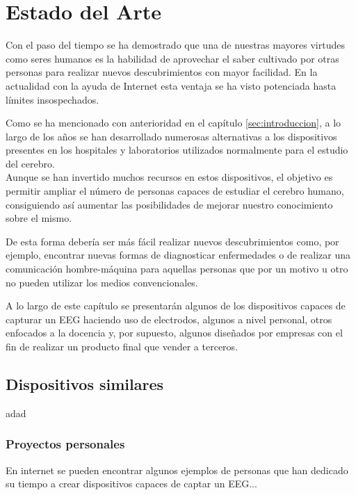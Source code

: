 \chapter{Estado del Arte\label{sec:EstadoDelArte}}

Con el paso del tiempo se ha demostrado que una de nuestras mayores virtudes como seres humanos es la habilidad de aprovechar el saber cultivado por otras personas para realizar nuevos descubrimientos con mayor facilidad. En la actualidad con la ayuda de Internet esta ventaja se ha visto potenciada hasta límites insospechados.

Como se ha mencionado con anterioridad en el capítulo \ref{sec:introduccion}, a lo largo de los años se han desarrollado numerosas alternativas a los dispositivos presentes en los hospitales y laboratorios utilizados normalmente para el estudio del cerebro. 
\\Aunque se han invertido muchos recursos en estos dispositivos, el objetivo es permitir ampliar el número de personas capaces de estudiar el cerebro humano, consiguiendo  así aumentar las posibilidades de mejorar nuestro conocimiento sobre el mismo.

De esta forma debería ser más fácil realizar nuevos descubrimientos como, por ejemplo, encontrar nuevas formas de diagnosticar enfermedades o de realizar una comunicación hombre-máquina para aquellas personas que por un motivo u otro no pueden utilizar los medios convencionales.

A lo largo de este capítulo se presentarán algunos de los dispositivos capaces de capturar un EEG haciendo uso de electrodos, algunos a nivel personal, otros enfocados a la docencia y, por supuesto, algunos diseñados por empresas con el fin de realizar un producto final que vender a terceros.

\clearpage

\section{Dispositivos similares\label{sec:Disp_similares}}

adad

\subsection{Proyectos personales\label{sec:Pro_personales}}

En internet se pueden encontrar algunos ejemplos de personas que han dedicado su tiempo a crear dispositivos capaces de captar un EEG...

